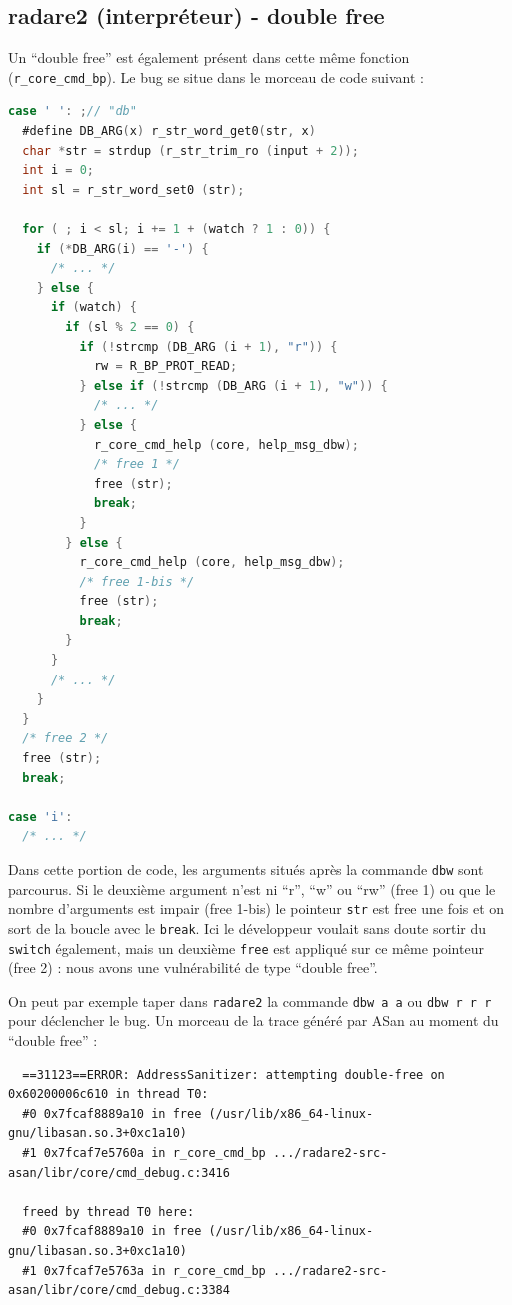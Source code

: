 \subsection{radare2 (interpréteur) - double free}

Un ``double free'' est également présent dans cette même fonction (\lstinline{r_core_cmd_bp}).
Le bug se situe dans le morceau de code suivant :

\begin{lstlisting}[language=C]
case ' ': ;// "db"
  #define DB_ARG(x) r_str_word_get0(str, x)
  char *str = strdup (r_str_trim_ro (input + 2));
  int i = 0;
  int sl = r_str_word_set0 (str);

  for ( ; i < sl; i += 1 + (watch ? 1 : 0)) {
    if (*DB_ARG(i) == '-') {
      /* ... */
    } else {
      if (watch) {
        if (sl % 2 == 0) {
          if (!strcmp (DB_ARG (i + 1), "r")) {
            rw = R_BP_PROT_READ;
          } else if (!strcmp (DB_ARG (i + 1), "w")) {
            /* ... */
          } else {
            r_core_cmd_help (core, help_msg_dbw);
            /* free 1 */
            free (str);
            break;
          }
        } else {
          r_core_cmd_help (core, help_msg_dbw);
          /* free 1-bis */
          free (str);
          break;
        }
      }
      /* ... */
    }
  }
  /* free 2 */
  free (str);
  break;

case 'i':
  /* ... */

\end{lstlisting}

Dans cette portion de code, les arguments situés après la commande \lstinline{dbw} sont parcourus.
Si le deuxième argument n'est ni ``r'', ``w'' ou ``rw'' (free 1) ou que le nombre d'arguments est impair (free 1-bis) le pointeur \lstinline{str} est free une fois et on sort de la boucle avec le \lstinline{break}.
Ici le développeur voulait sans doute sortir du \lstinline{switch} également, mais un deuxième \lstinline{free} est appliqué sur ce même pointeur (free 2) : nous avons une vulnérabilité de type ``double free''.

On peut par exemple taper dans \lstinline{radare2} la commande \lstinline{dbw a a} ou \lstinline{dbw r r r} pour déclencher le bug.
Un morceau de la trace généré par ASan au moment du ``double free'' :
\begin{lstlisting}
  ==31123==ERROR: AddressSanitizer: attempting double-free on 0x60200006c610 in thread T0:
  #0 0x7fcaf8889a10 in free (/usr/lib/x86_64-linux-gnu/libasan.so.3+0xc1a10)
  #1 0x7fcaf7e5760a in r_core_cmd_bp .../radare2-src-asan/libr/core/cmd_debug.c:3416

  freed by thread T0 here:
  #0 0x7fcaf8889a10 in free (/usr/lib/x86_64-linux-gnu/libasan.so.3+0xc1a10)
  #1 0x7fcaf7e5763a in r_core_cmd_bp .../radare2-src-asan/libr/core/cmd_debug.c:3384
\end{lstlisting}

